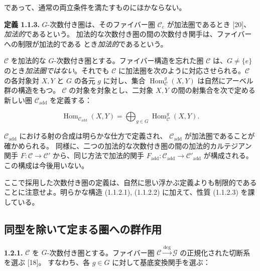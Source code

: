 \clearpage
{}%
であって、通常の両立条件を満たすものにほかならない。

\noindent\textbf{定義 1.1.3.}\quad
$G$-次数付き圏は、そのファイバー圏 $\mathcal C_e$ が加法圏であるとき [20]、
\emph{加法的}であるという。
加法的な次数付き圏の間の次数付き関手は、ファイバーへの制限が加法的である
とき\emph{加法的}であるという。

$\mathcal C$ を加法的な $G$-次数付き圏とする。ファイバー構造を忘れた圏
$\mathcal C$ は、$G\neq\{e\}$ のとき\emph{加法圏ではない}。それでも
$\mathcal C$ に加法圏を次のように対応させられる。$\mathcal C$ の各対象対
$X,Y$ と $G$ の各元 $g$ に対し、集合
$\operatorname{Hom}_{\mathcal C}^{g}(X,Y)$ は自然にアーベル群の構造をもつ。
$\mathcal C$ の対象を対象とし、二対象 $X,Y$ の間の射集合を次で定める新しい圏
$\mathcal C_{\mathrm{add}}$ を定義する：

\begingroup
\makeatletter
\tagsleft@true
\let\veqno\@@leqno
\makeatother
\begin{equation}
  \operatorname{Hom}_{\mathcal C_{\mathrm{add}}}(X,Y)
  =\bigoplus_{g\in G}\operatorname{Hom}_{\mathcal C}^{g}(X,Y).
  \tag{1.1.3.1}
\end{equation}
\endgroup

$\mathcal C_{\mathrm{add}}$ における射の合成は明らかな仕方で定義され、
$\mathcal C_{\mathrm{add}}$ が加法圏であることが確かめられる。
同様に、二つの加法的な次数付き圏の間の加法的カルテジアン関手
$F\colon\mathcal C\to\mathcal C'$ から、同じ方法で加法的関手
$F_{\mathrm{add}}\colon\mathcal C_{\mathrm{add}}\to
\mathcal C'_{\mathrm{add}}$ が構成される。この構成は今後用いない。

ここで採用した次数付き圏の定義は、自然に思い浮かぶ定義よりも制限的である
ことに注意せよ。明らかな構造 (1.1.2.1), (1.1.2.2) に加えて、性質
(1.1.2.3) を課している。

\subsection{同型を除いて定まる圏への群作用}

\noindent\textbf{1.2.1.}\quad
$\mathcal C$ を $G$-次数付き圏とする。ファイバー圏
$\mathcal C\xrightarrow{\deg}\mathcal G$ の正規化された切断系を選ぶ [18]。
すなわち、各 $g\in G$ に対して基底変換関手を選ぶ：

